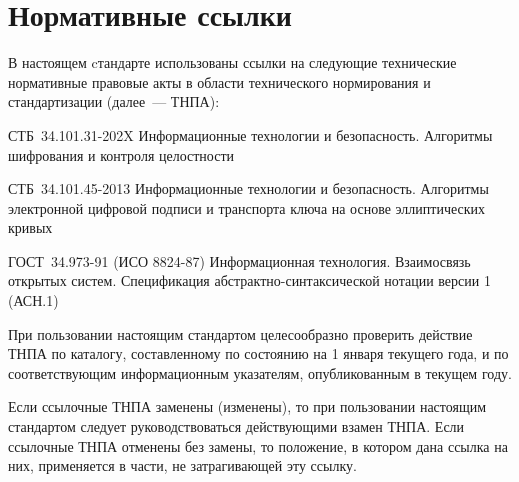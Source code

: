 \chapter{Нормативные ссылки}

В настоящем cтандарте использованы ссылки на следующие 
технические нормативные правовые акты в области 
технического нормирования и стандартизации (далее~--- ТНПА):

СТБ~34.101.31-202X Информационные технологии и безопасность. 
Алгоритмы шифрования и контроля целостности

СТБ~34.101.45-2013 Информационные технологии и безопасность. 
Алгоритмы электронной цифровой подписи и транспорта ключа на основе
эллиптических кривых

ГОСТ~34.973-91 (ИСО 8824-87) Информационная технология. Взаимосвязь
открытых систем. Спецификация абстрактно-синтаксической нотации
версии 1 (АСН.1)

\begin{note*}
При пользовании настоящим стандартом целесообразно проверить
действие ТНПА по каталогу, составленному по состоянию на 1 января текущего года,
и по соответствующим информационным указателям, опубликованным в текущем году.

Если ссылочные ТНПА заменены (изменены), то при пользовании настоящим стандартом
следует руководствоваться действующими взамен ТНПА. Если ссылочные ТНПА
отменены без замены, то положение, в котором дана ссылка на них, применяется в
части, не затрагивающей эту ссылку.
\end{note*}

